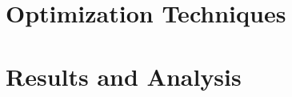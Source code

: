 \section{Optimization Techniques}
\label{sec:pa_optimization}

\lipsum[1]

\section{Results and Analysis}
\label{sec:pa_results}

\lipsum[1]